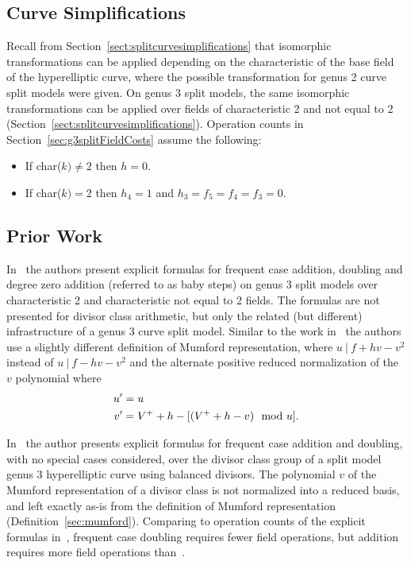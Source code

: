 \subsection{Curve Simplifications} 
\label{sect:g3splitcurvesimplifications}
Recall from Section~\ref{sect:splitcurvesimplifications} that isomorphic
transformations can be applied depending on the characteristic of the base field
of the hyperelliptic curve, where the possible transformation for genus 2 curve
split models were given. On genus 3 split models, the same isomorphic
transformations can be applied over fields of characteristic 2 and not equal to
2 (Section~\ref{sect:splitcurvesimplifications}). Operation counts in
Section~\ref{sec:g3splitFieldCosts} assume the following:
\begin{itemize}
\item  If char($k) \neq 2$ then $h = 0$.
\item  If char($k) = 2$ then $h_4 = 1$ and $h_3 = f_5 = f_4 = f_3 = 0$.
\end{itemize}


\subsection{Prior Work}
\label{sec:g3explSPLITPriorWork}

In~\cite{rad2019jacobian} the authors present explicit formulas for frequent
case addition, doubling and degree zero addition (referred to as baby steps) on
genus 3 split models over characteristic 2 and characteristic not equal to 2
fields. The formulas are not presented for divisor class arithmetic, but only
the related (but different) infrastructure of a genus 3 curve split model.
Similar to the work in~\cite{EricksonJacobsonStein_realg2_2011} the authors use
a slightly different definition of Mumford representation, where $u ~|~ f + hv -
v^2$ instead of $u ~|~ f - hv - v^2$ and the alternate positive reduced
normalization of the $v$ polynomial where 
\begin{align}
  u' & =  u \nonumber\\
  v' & =  V^{+} + h - [(V^{+} + h - v) \mod u]. 
\end{align}

In~\cite{Sutherland_g3_2019} the author presents explicit formulas for frequent
case addition and doubling, with no special cases considered, over the divisor
class group of a split model genus 3 hyperelliptic curve using balanced
divisors. The polynomial $v$ of the Mumford representation of a divisor class is
not normalized into a reduced basis, and left exactly as-is from the definition
of Mumford representation (Definition~\ref{sec:mumford}). Comparing to operation
counts of the explicit formulas in~\cite{rad2019jacobian}, frequent case
doubling requires fewer field operations, but addition requires more field
operations than~\cite{rad2019jacobian}.

